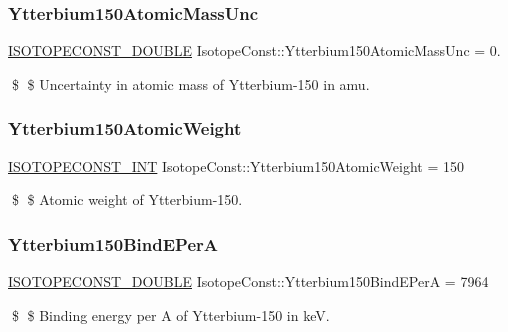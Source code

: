 \subsubsection{\texorpdfstring{Ytterbium150\+Atomic\+Mass\+Unc}{Ytterbium150AtomicMassUnc}}
{\footnotesize\ttfamily \mbox{\hyperlink{group___isotope_const-_macros_ga8f45a7272ce02c0b4c65c44636ed719a}{I\+S\+O\+T\+O\+P\+E\+C\+O\+N\+S\+T\+\_\+\+D\+O\+U\+B\+LE}} Isotope\+Const\+::\+Ytterbium150\+Atomic\+Mass\+Unc = 0.}

\$ \$ Uncertainty in atomic mass of Ytterbium-\/150 in amu. \mbox{\label{group___isotope_const-_ytterbium-_yb150_ga697859870933903991aa1936297284d6}} 
\subsubsection{\texorpdfstring{Ytterbium150\+Atomic\+Weight}{Ytterbium150AtomicWeight}}
{\footnotesize\ttfamily \mbox{\hyperlink{group___isotope_const-_macros_ga5f18360b3e99483a35c32d789e62621c}{I\+S\+O\+T\+O\+P\+E\+C\+O\+N\+S\+T\+\_\+\+I\+NT}} Isotope\+Const\+::\+Ytterbium150\+Atomic\+Weight = 150}

\$ \$ Atomic weight of Ytterbium-\/150. \mbox{\label{group___isotope_const-_ytterbium-_yb150_ga02851409a70b1a7097da8ea604185a90}} 
\subsubsection{\texorpdfstring{Ytterbium150\+Bind\+E\+PerA}{Ytterbium150BindEPerA}}
{\footnotesize\ttfamily \mbox{\hyperlink{group___isotope_const-_macros_ga8f45a7272ce02c0b4c65c44636ed719a}{I\+S\+O\+T\+O\+P\+E\+C\+O\+N\+S\+T\+\_\+\+D\+O\+U\+B\+LE}} Isotope\+Const\+::\+Ytterbium150\+Bind\+E\+PerA = 7964}

\$ \$ Binding energy per A of Ytterbium-\/150 in keV. \mbox{\label{group___isotope_const-_ytterbium-_yb150_ga824a2f58f8e82dbefa830adbf7d39429}} 
